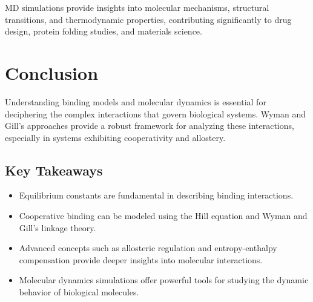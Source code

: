 \documentclass[english,course]{lecture}
\begin{document}
MD simulations provide insights into molecular mechanisms, structural transitions, and thermodynamic properties, contributing significantly to drug design, protein folding studies, and materials science.

\vfill
\eject


\section{Conclusion}

Understanding binding models and molecular dynamics is essential for deciphering the complex interactions that govern biological systems. Wyman and Gill's approaches provide a robust framework for analyzing these interactions, especially in systems exhibiting cooperativity and allostery.

\subsection{Key Takeaways}

\begin{itemize}
    \item Equilibrium constants are fundamental in describing binding interactions.
    \item Cooperative binding can be modeled using the Hill equation and Wyman and Gill's linkage theory.
    \item Advanced concepts such as allosteric regulation and entropy-enthalpy compensation provide deeper insights into molecular interactions.
    \item Molecular dynamics simulations offer powerful tools for studying the dynamic behavior of biological molecules.
\end{itemize}

\vfill
\eject


% 
% 
\end{document}
